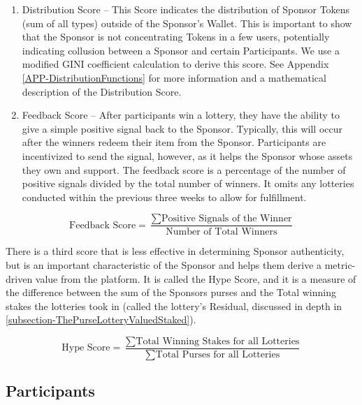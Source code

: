 \documentclass[runningheads]{llncs}
\begin{document}
\begin{enumerate}
\item Distribution Score – This Score indicates the distribution of Sponsor Tokens (sum of all types) outside of the Sponsor’s Wallet.  This is important to show that the Sponsor is not concentrating Tokens in a few users, potentially indicating collusion between a Sponsor and certain Participants.  We use a modified GINI coefficient calculation to derive this score.  See Appendix \ref{APP-DistributionFunctions} for more information and a mathematical description of the Distribution Score.
\item Feedback Score – After participants win a lottery, they have the ability to give a simple positive signal back to the Sponsor.  Typically, this will occur after the winners redeem their item from the Sponsor.  Participants are incentivized to send the signal, however, as it helps the Sponsor whose assets they own and support.  The feedback score is a percentage of the number of positive signals divided by the total number of winners.  It omits any lotteries conducted within the previous three weeks to allow for fulfillment.    
\end{enumerate}

$$
\textrm{Feedback Score} = \frac{\sum \textrm{Positive Signals of the Winner}}{\textrm{Number of Total Winners} }
$$

There is a third score that is less effective in determining Sponsor authenticity, but is an important characteristic of the Sponsor and helps them derive a metric-driven value from the platform.  It is called the Hype Score, and it is a measure of the difference between the sum of the Sponsors purses and the Total winning stakes the lotteries took in (called the lottery’s Residual, discussed in depth in \ref{subsection-ThePurseLotteryValuedStaked}).

$$
\textrm{Hype Score} = \frac{\sum \textrm{Total Winning Stakes for all Lotteries}}{\sum \textrm{Total Purses for all Lotteries}}
$$

\subsection{Participants}\label{subsection-Participants}
\end{document}

